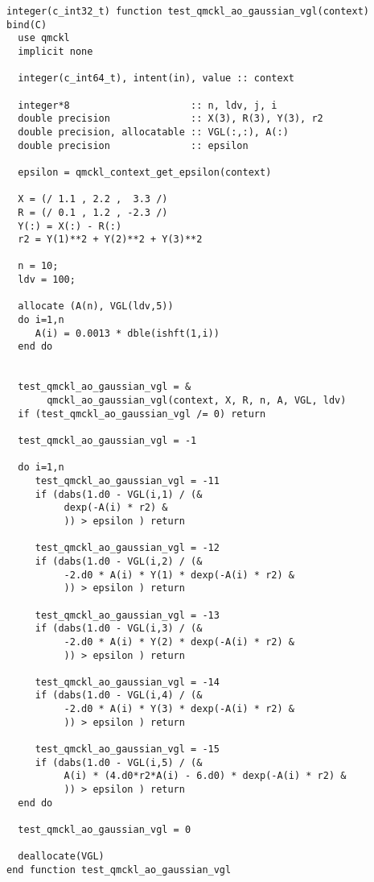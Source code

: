 \begin{verbatim}
integer(c_int32_t) function test_qmckl_ao_gaussian_vgl(context) bind(C)
  use qmckl
  implicit none

  integer(c_int64_t), intent(in), value :: context
  
  integer*8                     :: n, ldv, j, i
  double precision              :: X(3), R(3), Y(3), r2
  double precision, allocatable :: VGL(:,:), A(:)
  double precision              :: epsilon

  epsilon = qmckl_context_get_epsilon(context)

  X = (/ 1.1 , 2.2 ,  3.3 /)
  R = (/ 0.1 , 1.2 , -2.3 /)
  Y(:) = X(:) - R(:)
  r2 = Y(1)**2 + Y(2)**2 + Y(3)**2

  n = 10;
  ldv = 100;

  allocate (A(n), VGL(ldv,5))
  do i=1,n
     A(i) = 0.0013 * dble(ishft(1,i))
  end do


  test_qmckl_ao_gaussian_vgl = &
       qmckl_ao_gaussian_vgl(context, X, R, n, A, VGL, ldv)
  if (test_qmckl_ao_gaussian_vgl /= 0) return

  test_qmckl_ao_gaussian_vgl = -1

  do i=1,n
     test_qmckl_ao_gaussian_vgl = -11
     if (dabs(1.d0 - VGL(i,1) / (&
          dexp(-A(i) * r2) &
          )) > epsilon ) return
     
     test_qmckl_ao_gaussian_vgl = -12
     if (dabs(1.d0 - VGL(i,2) / (&
          -2.d0 * A(i) * Y(1) * dexp(-A(i) * r2) &
          )) > epsilon ) return
     
     test_qmckl_ao_gaussian_vgl = -13
     if (dabs(1.d0 - VGL(i,3) / (&
          -2.d0 * A(i) * Y(2) * dexp(-A(i) * r2) &
          )) > epsilon ) return
     
     test_qmckl_ao_gaussian_vgl = -14
     if (dabs(1.d0 - VGL(i,4) / (&
          -2.d0 * A(i) * Y(3) * dexp(-A(i) * r2) &
          )) > epsilon ) return
     
     test_qmckl_ao_gaussian_vgl = -15
     if (dabs(1.d0 - VGL(i,5) / (&
          A(i) * (4.d0*r2*A(i) - 6.d0) * dexp(-A(i) * r2) &
          )) > epsilon ) return
  end do

  test_qmckl_ao_gaussian_vgl = 0
     
  deallocate(VGL)
end function test_qmckl_ao_gaussian_vgl
\end{verbatim}

